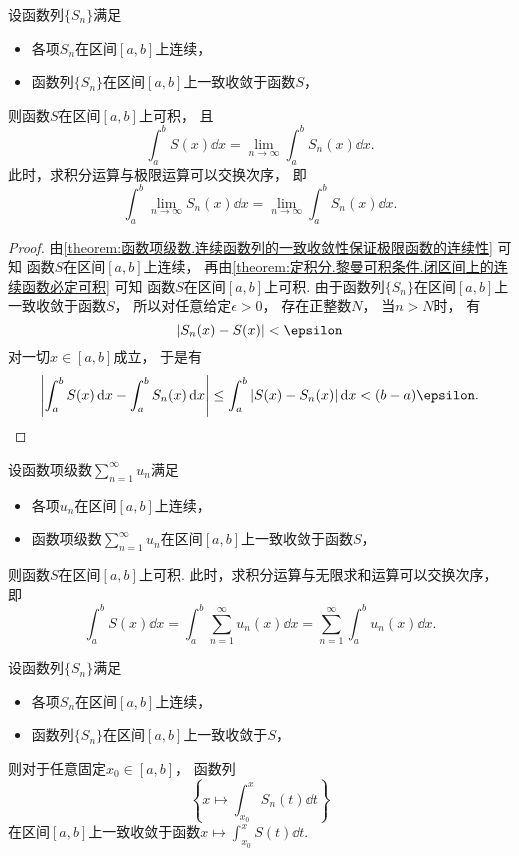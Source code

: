 \begin{theorem}\label{theorem:函数项级数.连续函数列的一致收敛性保证极限函数的可积性}
设函数列\(\{S_n\}\)满足\begin{itemize}
	\item 各项\(S_n\)在区间\([a,b]\)上连续，
	\item 函数列\(\{S_n\}\)在区间\([a,b]\)上一致收敛于函数\(S\)，
\end{itemize}
则函数\(S\)在区间\([a,b]\)上可积，
且\[
	\int_a^b S(x) \dd{x}
	= \lim_{n\to\infty} \int_a^b S_n(x) \dd{x}.
\]
此时，求积分运算与极限运算可以交换次序，
即\[
	\int_a^b \lim_{n\to\infty} S_n(x) \dd{x}
	= \lim_{n\to\infty} \int_a^b S_n(x) \dd{x}.
\]
\begin{proof}
由\cref{theorem:函数项级数.连续函数列的一致收敛性保证极限函数的连续性} 可知
函数\(S\)在区间\([a,b]\)上连续，
再由\cref{theorem:定积分.黎曼可积条件.闭区间上的连续函数必定可积} 可知
函数\(S\)在区间\([a,b]\)上可积.
由于函数列\(\{S_n\}\)在区间\([a,b]\)上一致收敛于函数\(S\)，
所以对任意给定\(\epsilon>0\)，
存在正整数\(N\)，
当\(n>N\)时，
有\[
	\abs{S_n(x) - S(x)} < \epsilon
\]对一切\(x\in[a,b]\)成立，
于是有\[
	\abs{\int_a^b S(x) \dd{x} - \int_a^b S_n(x) \dd{x}}
	\leq \int_a^b \abs{S(x) - S_n(x)} \dd{x}
	< (b-a) \epsilon.
	\qedhere
\]
\end{proof}
\end{theorem}
\begin{theorem}\label{theorem:函数项级数.连续函数项级数的一致收敛性保证和函数的可积性}
设函数项级数\(\sum_{n=1}^\infty u_n\)满足\begin{itemize}
	\item 各项\(u_n\)在区间\([a,b]\)上连续，
	\item 函数项级数\(\sum_{n=1}^\infty u_n\)在区间\([a,b]\)上一致收敛于函数\(S\)，
\end{itemize}
则函数\(S\)在区间\([a,b]\)上可积.
此时，求积分运算与无限求和运算可以交换次序，
即\[
	\int_a^b S(x) \dd{x}
	= \int_a^b \sum_{n=1}^\infty u_n(x) \dd{x}
	= \sum_{n=1}^\infty \int_a^b u_n(x) \dd{x}.
\]
\end{theorem}
\begin{proposition}
设函数列\(\{S_n\}\)满足\begin{itemize}
	\item 各项\(S_n\)在区间\([a,b]\)上连续，
	\item 函数列\(\{S_n\}\)在区间\([a,b]\)上一致收敛于\(S\)，
\end{itemize}
则对于任意固定\(x_0\in[a,b]\)，
函数列\[
	\left\{x \mapsto \int_{x_0}^x S_n(t) \dd{t}\right\}
\]在区间\([a,b]\)上一致收敛于函数\(x \mapsto \int_{x_0}^x S(t) \dd{t}\).
\end{proposition}
